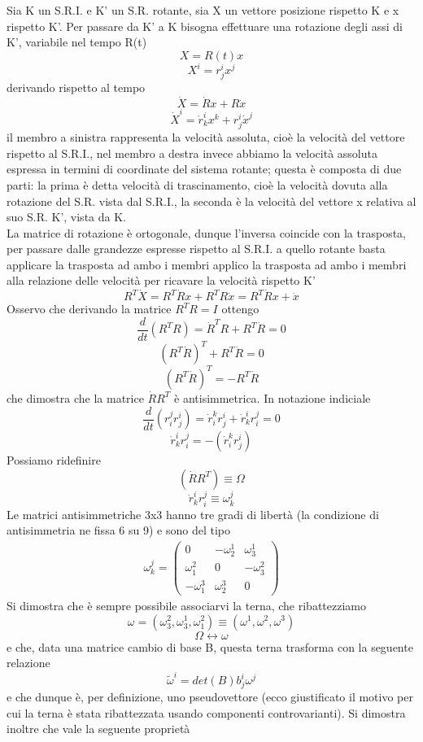 \documentclass[
10pt, %
a4paper, %
oneside, %
headinclude,footinclude, %
BCOR5mm, %
]{scrartcl}
\begin{document}
\begin{esempio}
	Sia K un S.R.I. e K' un S.R. rotante, sia X un vettore posizione rispetto K e x rispetto K'. Per passare da K' a K bisogna effettuare una rotazione degli assi di K', variabile nel tempo R(t)
	\[X = R(t)x\]
	\[X^i = r^i_jx^j\]
	derivando rispetto al tempo 
	\[\dot{X} = \dot{R}x+R\dot{x}\]	
	\[\dot{X}^i = \dot{r}^i_kx^k+r^i_j\dot{x}^j\]	
	il membro a sinistra rappresenta la velocità assoluta, cioè la velocità del vettore rispetto al S.R.I., nel membro a destra invece abbiamo la velocità assoluta espressa in termini di coordinate del sistema rotante; questa è composta di due parti: la prima è detta velocità di trascinamento, cioè la velocità dovuta alla rotazione del S.R. vista dal S.R.I., la seconda è la velocità del vettore x relativa al suo S.R. K', vista da K.\\
	La matrice di rotazione è ortogonale, dunque l'inversa coincide con la trasposta, per passare dalle grandezze espresse rispetto al S.R.I. a quello rotante basta applicare la trasposta ad ambo i membri
	applico la trasposta ad ambo i membri alla relazione delle velocità per ricavare la velocità rispetto K'
	\[R^T\dot{X} = R^T\dot{R}x+R^TR\dot{x} = R^T\dot{R}x+\dot{x}\]
	Osservo che derivando la matrice \(R^TR = I\) ottengo
	\[\frac{d}{dt}(R^TR) = \dot{R}^TR+R^T\dot{R} = 0\]
	\[(R^T\dot{R})^T+R^T\dot{R} = 0\]
	\[(R^T\dot{R})^T= -R^T\dot{R} \]
	che dimostra che la matrice \(\dot{R}R^T\) è antisimmetrica. In notazione indiciale
	\[\frac{d}{dt}(r^j_ir^i_j) = \dot{r}^k_ir^i_j+\dot{r}^i_kr^j_i = 0\]
	\[\dot{r}^i_kr^j_i = -(\dot{r}^k_ir^i_j)\]
	Possiamo ridefinire
	\[(\dot{R}R^T)\equiv\Omega\]
	\[\dot{r}^i_kr^j_i\equiv\omega^j_k\]
	Le matrici antisimmetriche 3x3 hanno tre gradi di libertà (la condizione di antisimmetria ne fissa 6 su 9) e sono del tipo
	\begin{align*}
		\omega^j_k = 
		\begin{pmatrix}
			0&-\omega^1_2&\omega^1_3\\
			\omega^2_1&0&-\omega^2_3\\
			-\omega^3_1&\omega^3_2&0
		\end{pmatrix}
	\end{align*}
	Si dimostra che è sempre possibile associarvi la terna, che ribattezziamo
	\[\omega = (\omega^2_3, \omega^1_3, \omega^2_1) \equiv (\omega^1, \omega^2, \omega^3)\]
	\[\Omega \leftrightarrow \omega\]
	e che, data una matrice cambio di base B, questa terna trasforma con la seguente relazione
	\[\tilde{\omega}^i = det(B) b^i_j\omega^j \]
	e che dunque è, per definizione, uno pseudovettore (ecco giustificato il motivo per cui la terna è stata ribattezzata usando componenti controvarianti). Si dimostra inoltre che vale la seguente proprietà

\end{esempio}
\end{document}
